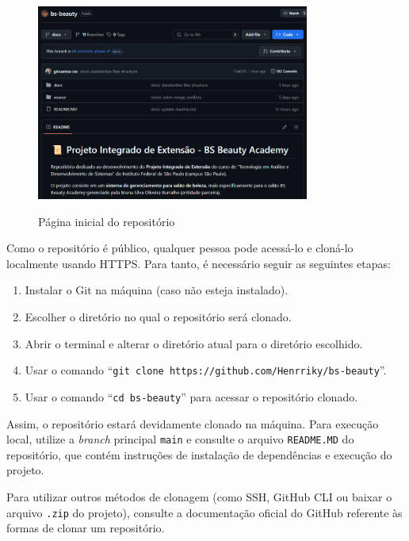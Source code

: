 \begin{figure}[h]
	\centering
	\caption{Página inicial do repositório}
	\includegraphics[width=0.8\textwidth]{cap03-gestao/imagens/bsbeauty-repositorio.png}
	\label{fig:inicio-repositorio}
\end{figure}

Como o repositório é público, qualquer pessoa pode acessá-lo e cloná-lo localmente usando HTTPS. Para tanto, é necessário seguir as seguintes etapas:
 
\begin{enumerate}
	\item Instalar o Git na máquina (caso não esteja instalado).
	\item Escolher o diretório no qual o repositório será clonado.
	\item Abrir o terminal e alterar o diretório atual para o diretório escolhido.
	\item Usar o comando ``\texttt{git clone https://github.com/Henrriky/bs-beauty}''.
	\item Usar o comando ``\texttt{cd bs-beauty}'' para acessar o repositório clonado.
\end{enumerate}

Assim, o repositório estará devidamente clonado na máquina. Para execução local, utilize a \textit{branch} principal \texttt{main} e consulte o arquivo \texttt{README.MD} do repositório, que contém instruções de instalação de dependências e execução do projeto.

Para utilizar outros métodos de clonagem (como SSH, GitHub CLI ou baixar o arquivo \texttt{.zip} do projeto), consulte a documentação oficial do GitHub \cite{GitHubClonagem} referente às formas de clonar um repositório.